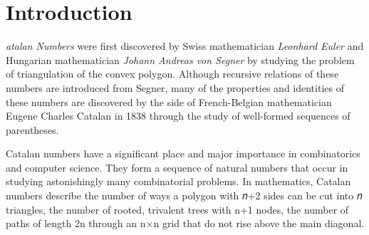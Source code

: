 \newpage
\section{Introduction}
\lettrine[findent=2pt]{}{ }\textit{atalan Numbers} were first discovered by Swiss mathematician \textit{Leonhard Euler} and Hungarian mathematician \textit{Johann Andreas von Segner} by studying the problem of triangulation of the convex polygon. 
Although recursive relations of these numbers are introduced from Segner, many of the properties and identities of these numbers are discovered by the side of French-Belgian mathematician Eugene Charles Catalan in 1838 through the study of well-formed sequences of parentheses.

Catalan numbers have a significant place and major importance in combinatorics and computer science. They form a sequence of natural numbers that occur in studying astonishingly many combinatorial problems. In mathematics, Catalan numbers describe the number of ways a polygon with 𝑛+2 sides can be cut into 𝑛 triangles, the number of rooted, trivalent trees with n+1 nodes, the number of paths of length 2n through an n×n grid that do not rise above the main diagonal. 